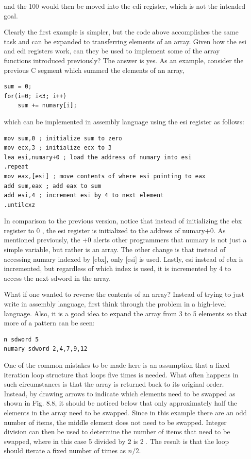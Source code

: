 \documentclass[10pt]{book}
\begin{document}
and the 100 would then be moved into the edi register, which is not the intended goal.

Clearly the first example is simpler, but the code above accomplishes the same task and can be expanded to transferring elements of an array. Given how the esi and edi registers work, can they be used to implement some of the array functions introduced previously? The answer is yes. As an example, consider the previous C segment which summed the elements of an array,

\begin{verbatim}
sum = 0;
for(i=0; i<3; i++)
    sum += numary[i];
\end{verbatim}

which can be implemented in assembly language using the esi register as follows:

\begin{verbatim}
mov sum,0 ; initialize sum to zero
mov ecx,3 ; initialize ecx to 3
lea esi,numary+0 ; load the address of numary into esi
.repeat
mov eax,[esi] ; move contents of where esi pointing to eax
add sum,eax ; add eax to sum
add esi,4 ; increment esi by 4 to next element
.untilcxz
\end{verbatim}

In comparison to the previous version, notice that instead of initializing the ebx register to 0 , the esi register is initialized to the address of numary+0. As mentioned previously, the +0 alerts other programmers that numary is not just a simple variable, but rather is an array. The other change is that instead of accessing numary indexed by [ebx], only [esi] is used. Lastly, esi instead of ebx is incremented, but regardless of which index is used, it is incremented by 4 to access the next sdword in the array.

What if one wanted to reverse the contents of an array? Instead of trying to just write in assembly language, first think through the problem in a high-level language. Also, it is a good idea to expand the array from 3 to 5 elements so that more of a pattern can be seen:

\begin{verbatim}
n sdword 5
numary sdword 2,4,7,9,12
\end{verbatim}

One of the common mistakes to be made here is an assumption that a fixed-iteration loop structure that loops five times is needed. What often happens in such circumstances is that the array is returned back to its original order. Instead, by drawing arrows to indicate which elements need to be swapped as shown in Fig. 8.8, it should be noticed below that only approximately half the elements in the array need to be swapped. Since in this example there are an odd number of items, the middle element does not need to be swapped. Integer division can then be used to determine the number of items that need to be swapped, where in this case 5 divided by 2 is 2 . The result is that the loop should iterate a fixed number of times as $n / 2$.
\end{document}
